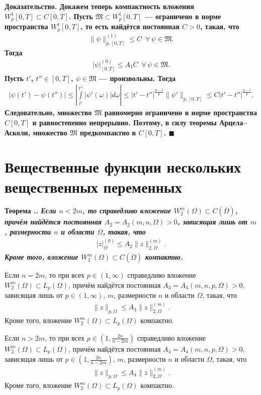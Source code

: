 \documentclass{report}
\newcounter{rem}[section]
\newcounter{theor}[section]
\renewcommand{\thetheor}{\thesection.\arabic{theor}}
\newenvironment{Theorem}{\par\refstepcounter{theor}\bf Теорема \thetheor. \it}{\rm\par}
\newenvironment{Proof}{\par\noindent\bf Доказательство.\rm}{ $\blacksquare$\par}
\begin{document}
\begin{Proof}
Докажем теперь компактность вложения $W^1_p[0,T]\subset C[0,T]$. Пусть $\mathfrak{M}\subset W^1_p[0,T]$ --- ограничено в норме пространства
$W^1_p[0,T]$, то есть найдётся постоянная $C>0$, такая, что
\begin{gather*}
\|\psi\|_{p,[0,T]}^{(1)}\leqslant C\,\,\,\forall\,\psi\in\mathfrak{M}.
\end{gather*}
Тогда
\begin{gather*}
\pmb{|}\psi\pmb{|}^{(0)}_{[0,T]}\leqslant A_1C\,\,\,\forall\,\psi\in\mathfrak{M}.
\end{gather*}
Пусть $t'$, $t''\in[0,T]$, $\psi\in\mathfrak{M}$ --- произвольны. Тогда
\begin{gather*}
|\psi(t')-\psi(t'')|\leqslant\left|\int\limits_{t'}^{t''}|\psi'(\omega)|d\omega\right|\leqslant
|t'-t''|^{\frac{p-1}{p}}\|\psi'\|_{p,[0,T]}\leqslant C|t'-t''|^{\frac{p-1}{p}}.
\end{gather*}
Следовательно, множество $\mathfrak{M}$ равномерно ограничено в норме пространства $C[0,T]$ и равностепенно непрерывно. Поэтому, в силу
теоремы Арцела--Асколи, множество $\mathfrak{M}$ предкомпактно в $C[0,T]$.
\end{Proof}

        \section{Вещественные функции нескольких вещественных переменных}
\begin{Theorem}\label{embeddingWm2Omega} \cite[стр.84--85]{lad}
Если $n<2m$, то справедливо вложение $W^m_2(\Omega)\subset C(\bar\Omega)$, причём найдётся постоянная $A_2=A_2(m,n,\Omega)>0$, зависящая
лишь от $m$, размерности $n$ и области $\Omega$, такая, что
\begin{gather*}
\pmb{|}z\pmb{|}^{(0)}_{\bar\Omega}\leqslant A_2\|z\|^{(m)}_{2,\Omega}.
\end{gather*}
Кроме того, вложение $W^m_2(\Omega)\subset C(\bar\Omega)$ компактно.

Если $n=2m$, то при всех $p\in(1,\infty)$ справедливо вложение $W^m_2(\Omega)\subset L_p(\Omega)$, причём найдётся постоянная
$A_3=A_3(m,n,p,\Omega)>0$, зависящая лишь от $p\in(1,\infty)$, $m$, размерности $n$ и области $\Omega$, такая, что
\begin{gather*}
\|z\|_{p,\Omega}\leqslant A_3\|z\|^{(m)}_{2,\Omega}.
\end{gather*}
Кроме того, вложение $W^m_2(\Omega)\subset L_p(\Omega)$ компактно.

Если $n>2m$, то при всех $p\in(1,\frac{2n}{n-2m})$ справедливо вложение $W^m_2(\Omega)\subset L_p(\Omega)$, причём найдётся постоянная
$A_4=A_4(m,n,p,\Omega)>0$, зависящая лишь от $p\in(1,\frac{2n}{n-2m})$, $m$, размерности $n$ и области $\Omega$, такая, что
\begin{gather*}
\|z\|_{p,\Omega}\leqslant A_4\|z\|^{(m)}_{2,\Omega}.
\end{gather*}
Кроме того, вложение $W^m_2(\Omega)\subset L_p(\Omega)$ компактно.
\end{Theorem}
\end{document}
